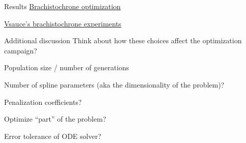 \documentclass[presentation]{beamer}
\begin{document}
\begin{frame}[label={sec:orgda0653b}]{Results}
\href{file:///Users/tp5/code/optex/brachistochrone.mp4}{Brachistochrone optimization}

\href{https://www.youtube.com/watch?v=skvnj67YGmw\&feature=youtu.be\&t=17m30s}{Vsauce's brachistochrone experiments}
\end{frame}

\begin{frame}[label={sec:org74954bd}]{Additional discussion}
Think about how these choices affect the optimization campaign?
\begin{block}{Population size / number of generations}
\end{block}
\begin{block}{Number of spline parameters (aka the dimensionality of the problem)?}
\end{block}
\begin{block}{Penalization coefficients?}
\end{block}
\begin{block}{Optimize ``part'' of the problem?}
\end{block}
\begin{block}{Error tolerance of ODE solver?}
\end{block}
\end{frame}
\end{document}
